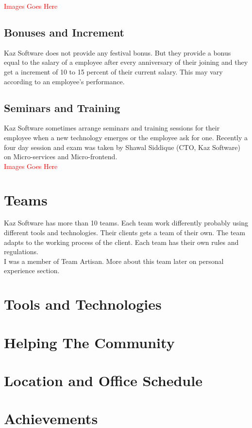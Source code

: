 \textcolor{red}{\LARGE Images Goes Here}

\subsection{Bonuses and Increment}

Kaz Software does not provide any festival bonus.
But they provide a bonus equal to the salary of a employee after every anniversary of their joining and they get a increment of 10 to 15 percent of their current salary.
This may vary according to an employee's performance.

\subsection{Seminars and Training}

Kaz Software sometimes arrange seminars and training sessions for their employee when a new technology emerges or the employee ask for one.
Recently a four day session and exam was taken by Shawal Siddique (CTO, Kaz Software) on Micro-services and Micro-frontend.
\\

\textcolor{red}{\LARGE Images Goes Here}

\section{Teams}

Kaz Software has more than 10 teams.
Each team work differently probably using different tools and technologies.
Their clients gets a team of their own.
The team adapts to the working process of the client.
Each team has their own rules and regulations.\\

I was a member of Team Artisan.
More about this team later on personal experience section.

\section{Tools and Technologies}

\section{Helping The Community}

\section{Location and Office Schedule}

\section{Achievements}

